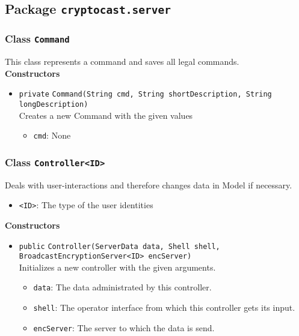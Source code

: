 \subsection{Package \lstinline!cryptocast.server!}
\subsubsection{Class \lstinline|Command|}
This class represents a command and saves all legal commands. \\




\textbf{Constructors}
\begin{itemize}
\item \lstinline|private| \lstinline|Command|\lstinline|(String cmd, String shortDescription, String longDescription)|\\
Creates a new Command with the given values
\begin{itemize}
\item \lstinline|cmd|: None
\end{itemize}



\end{itemize}


\subsubsection{Class \lstinline|Controller<ID>|}
Deals with user-interactions and therefore changes data in Model if necessary. \\


\begin{itemize}
\item \lstinline|<ID>|: The type of the user identities
\end{itemize}


\textbf{Constructors}
\begin{itemize}
\item \lstinline|public| \lstinline|Controller|\lstinline|(ServerData data, Shell shell, BroadcastEncryptionServer<ID> encServer)|\\
Initializes a new controller with the given arguments.
\begin{itemize}
\item \lstinline|data|: The data administrated by this controller.
\item \lstinline|shell|: The operator interface from which this controller gets its input.
\item \lstinline|encServer|: The server to which the data is send.
\end{itemize}



\end{itemize}


